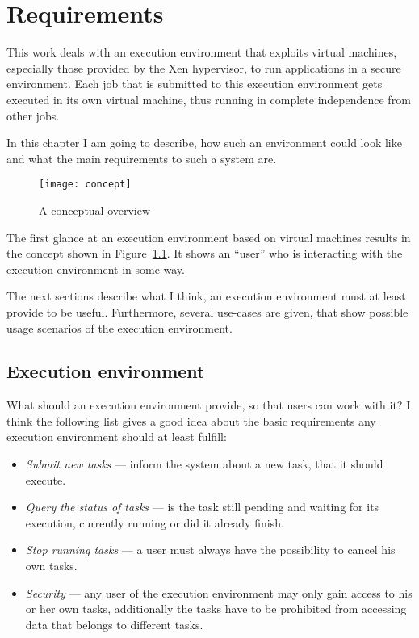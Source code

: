 \chapter{Requirements}
\label{cha:requirements}

This  work  deals with  an  execution  environment  that exploits  virtual
machines,  especially  those  provided  by  the  Xen  hypervisor,  to  run
applications in a  secure environment. Each job that  is submitted to this
execution  environment gets  executed  in its  own  virtual machine,  thus
running in complete independence from other jobs.

In this chapter I am going to describe, how such an environment could look
like and what the main requirements to such a system are.

\begin{figure}[htbp]
  \centering
  \texttt{[image: concept]}
  \caption[Conceptual overview]{A conceptual overview}
  \label{fig:concept}
\end{figure}

The first  glance at  an execution environment  based on  virtual machines
results  in the concept  shown in  Figure~\ref{fig:concept}.  It  shows an
``user'' who is interacting with the execution environment in some way.

\medskip

The next sections describe what  I think, an execution environment must at
least provide to be useful. Furthermore, several use-cases are given, that
show possible usage scenarios of the execution environment.

\section{Execution environment}
\label{sec:req-execution-environment}

What should an execution environment  provide, so that users can work with
it?   I  think the  following  list  gives a  good  idea  about the  basic
requirements any execution environment should at least fulfill:

\begin{itemize}
\item \emph{Submit new tasks} --- \ie inform the system about a new task,
  that it should execute.
\item \emph{Query the status of  tasks} --- \ie is the task still pending
  and  waiting for  its execution,  currently  running or  did it  already
  finish.
\item \emph{Stop running tasks} --- \ie a user must always have the
  possibility to cancel his own tasks.
\item \emph{Security}  --- \ie any user of the  execution environment may
  only gain access to his or her own tasks, additionally the tasks have to
  be prohibited from accessing data that belongs to different tasks.
\end{itemize}

